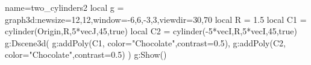 \documentclass[12pt]{standalone}
\begin{document}
\begin{luadraw}{name=two_cylinders2}
local g = graph3d:new{size={12,12},window={-6,6,-3,3},viewdir={30,70}}
local R = 1.5
local C1 = cylinder(Origin,R,5*vecJ,45,true)
local C2 = cylinder(-5*vecI,R,5*vecI,45,true)
g:Dscene3d(
    g:addPoly(C1, {color="Chocolate",contrast=0.5}),
    g:addPoly(C2, {color="Chocolate",contrast=0.5})
    )
g:Show()
\end{luadraw} 
\end{document}
